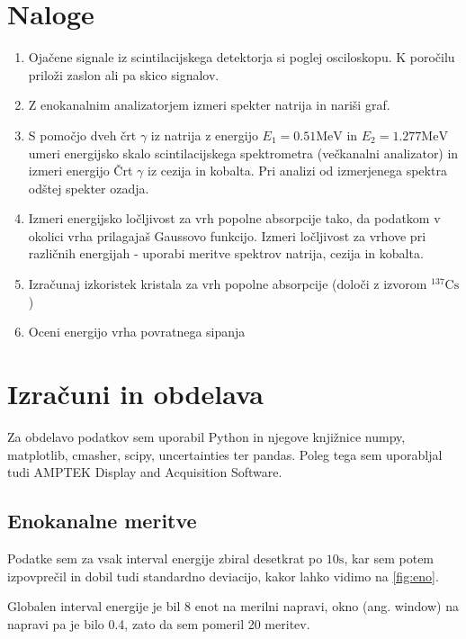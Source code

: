 \documentclass[11pt]{article}
\begin{document}
\section{Naloge}\label{sec:org6346c70}
\begin{enumerate}
\item Ojačene signale iz scintilacijskega detektorja si poglej osciloskopu. K poročilu priloži zaslon ali pa skico signalov.
\item Z enokanalnim analizatorjem izmeri spekter natrija in nariši graf.
\item S pomočjo dveh črt \(\gamma\) iz natrija z energijo \(E_1 = 0.51 \mathrm{MeV}\)
in \(E_2 = 1.277 \mathrm{MeV}\) umeri energijsko skalo scintilacijskega
spektrometra (večkanalni analizator) in izmeri energijo Črt \(\gamma\) iz
cezija in kobalta. Pri analizi od izmerjenega spektra odštej spekter ozadja.
\item Izmeri energijsko ločljivost za vrh popolne absorpcije tako, da podatkom v
okolici vrha prilagajaš Gaussovo funkcijo. Izmeri ločljivost za vrhove pri
različnih energijah - uporabi meritve spektrov natrija, cezija in kobalta.
\item Izračunaj izkoristek kristala za vrh popolne absorpcije (določi z izvorom
\(^{137} \mathrm{Cs}\))
\item Oceni energijo vrha povratnega sipanja
\end{enumerate}
\section{Izračuni in obdelava}\label{sec:org8f92a5e}
Za obdelavo podatkov sem uporabil Python in njegove knjižnice numpy, matplotlib, cmasher, scipy, uncertainties ter pandas. Poleg tega sem uporabljal tudi AMPTEK Display and Acquisition Software.

\subsection{Enokanalne meritve}\label{sec:orgb677120}

Podatke sem za vsak interval energije zbiral desetkrat po \(10 \mathrm{s}\), kar sem potem izpovprečil in dobil tudi standardno deviacijo, kakor lahko vidimo na \ref{fig:eno}.

Globalen interval energije je bil 8 enot na merilni napravi, okno (ang. window) na napravi pa je bilo 0.4, zato da sem pomeril 20 meritev.
\end{document}
